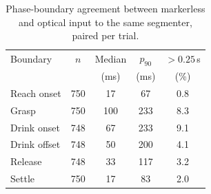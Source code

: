 \begin{table}[t]
\caption{Phase-boundary agreement between markerless and optical input to the
same segmenter, paired per trial.}
\label{tab:boundaries}
\centering
\footnotesize
\begin{tabular}{lcccc}
\toprule
Boundary & $n$ & Median & $p_{90}$ & $>0.25$\,s \\
 & & (ms) & (ms) & (\%) \\
\midrule
Reach onset & 750 & 17 & 67 & 0.8 \\
Grasp & 750 & 100 & 233 & 8.3 \\
Drink onset & 748 & 67 & 233 & 9.1 \\
Drink offset & 748 & 50 & 200 & 4.1 \\
Release & 748 & 33 & 117 & 3.2 \\
Settle & 750 & 17 & 83 & 2.0 \\
\bottomrule
\end{tabular}
\end{table}
